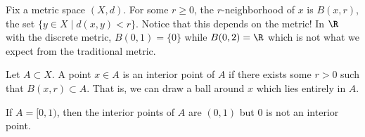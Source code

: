 \begin{example}
\end{example}

\begin{definition}[Neighborhood]
Fix a metric space $(X,d)$. For some $r \geq 0$, the $r$-neighborhood of $x$ is $B(x,r)$, the set $\{y \in X \mid d(x,y) < r\}$. Notice that this depends on the metric! In $\R$ with the discrete metric, $B(0,1) = \{0\}$ while $B(0,2) = \R$ which is not what we expect from the traditional metric.
\end{definition}

\begin{definition}
Let $A \subset X$. A point $x \in A$ is an interior point of $A$ if there exists some $r > 0$ such that $B(x,r) \subset A$. That is, we can draw a ball around $x$ which lies entirely in $A$.
\end{definition}

\begin{example}
If $A = [0,1)$, then the interior points of $A$ are $(0,1)$ but $0$ is not an interior point.
\end{example}


